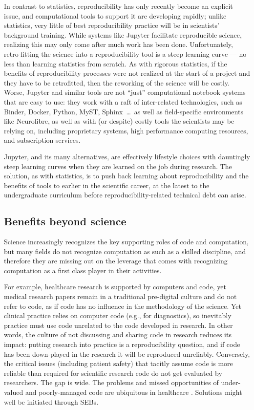 \documentclass{comjnl}
\begin{document}
In contrast to statistics, reproducibility has only recently become an explicit issue, and computational tools to support it are developing rapidly; unlike statistics, very little of best reproducibility practice will be in scientists' background training. While systems like Jupyter facilitate reproducible science, realizing this may only come after much work has been done. Unfortunately, retro-fitting the science into a reproducibility tool is a steep learning curve --- no less than learning statistics from scratch. As with rigorous statistics, if the benefits of reproducibility processes were not realized at the start of a project and they have to be retrofitted, then the reworking of the science will be costly. Worse, Jupyter and similar tools are not ``just'' computational notebook systems that are easy to use: they work with a raft of inter-related technologies, such as Binder, Docker, Python, MyST, Sphinx\ \ldots\ as well as field-specific environments like Neurolibre, as well as with (or despite) costly tools the scientists may be relying on, including proprietary systems, high performance computing resources, and subscription services.

Jupyter, and its many alternatives, are effectively lifestyle choices with dauntingly steep learning curves when they are learned on the job during research. The solution, as with statistics, is to push back learning about reproducibility and the benefits of tools to earlier in the scientific career, at the latest to the undergraduate curriculum before reproducibility-related technical debt can arise.

\subsection{Benefits beyond science}\label{benefits-beyond-science}
Science increasingly recognizes the key supporting roles of code and computation, but many fields do not recognize computation as such as a skilled discipline, and therefore they are missing out on the leverage that comes with recognizing computation as a first class player in their activities. 

For example, healthcare research is supported by computers and code, yet medical research papers remain in a traditional pre-digital culture and do not refer to code, as if code has no influence in the methodology of the science. Yet clinical practice relies on computer code (e.g., for diagnostics), so inevitably practice must use code unrelated to the code developed in research. In other words, the culture of not discussing and sharing code in research reduces its impact: putting research into practice is a reproducibility question, and if code has been down-played in the research it will be reproduced unreliably. Conversely, the critical issues (including patient safety) that tacitly assume code is more reliable than required for scientific research code do not get evaluated by researchers. The gap is wide. The problems and missed opportunities of under-valued and poorly-managed code are ubiquitous in healthcare \cite{fixit}. Solutions might well be initiated through SEBs.
\end{document}
